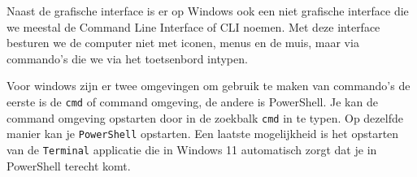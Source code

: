 Naast de grafische interface is er op Windows ook een niet grafische interface die we meestal de Command Line Interface of CLI noemen. Met deze interface besturen we de computer niet met iconen, menus en de muis, maar via commando's die we via het toetsenbord intypen.

Voor windows zijn er twee omgevingen om gebruik te maken van commando's de eerste is de \texttt{cmd} of command omgeving, de andere is PowerShell. Je kan de command omgeving opstarten door in de zoekbalk \texttt{cmd} in te typen. Op dezelfde manier kan je \texttt{PowerShell} opstarten. Een laatste mogelijkheid is het opstarten van de \texttt{Terminal} applicatie die in Windows 11 automatisch zorgt dat je in PowerShell terecht komt.
